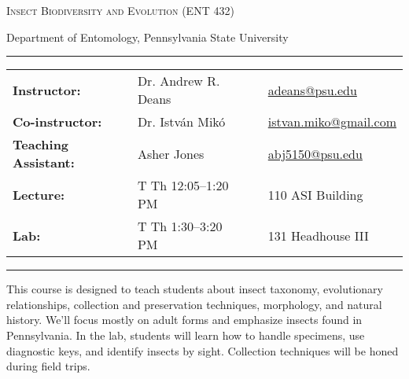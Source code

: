 \documentclass[11pt]{article}
\begin{document}
\begin{center}
{\huge \textsc{Insect Biodiversity and Evolution (ENT 432)}}
\end{center}
\begin{center}
Department of Entomology, Pennsylvania State University\end{center}

\begin{center}
\rule{6in}{0.4pt}
\begin{minipage}[t]{.74\textwidth}
\begin{tabular}{llcl}
\textbf{Instructor:} & Dr. Andrew R. Deans & &  \href{mailto:adeans@psu.edu}{adeans@psu.edu} \\
\textbf{Co-instructor:} & Dr. Istv\'an Mik\'o & &  \href{mailto:istvan.miko@gmail.com}{istvan.miko@gmail.com} \\
\textbf{Teaching Assistant:} & Asher Jones & &  \href{mailto:abj5150@psu.edu}{abj5150@psu.edu} \\
\textbf{Lecture:} & T Th 12:05--1:20 PM & & 110 ASI Building \\
\textbf{Lab:} & T Th 1:30--3:20 PM & & 131 Headhouse III \\
\end{tabular}
\end{minipage}
\rule{6in}{0.4pt}
\end{center}
\vspace{.3cm}
\setlength{\unitlength}{1in}
\renewcommand{\arraystretch}{2}

This course is designed to teach students about insect taxonomy, evolutionary relationships, collection and preservation techniques, morphology, and natural history. We'll focus mostly on adult forms and emphasize insects found in Pennsylvania. In the lab, students will learn how to handle specimens, use diagnostic keys, and identify insects by sight. Collection techniques will be honed during field trips.
\end{document}

